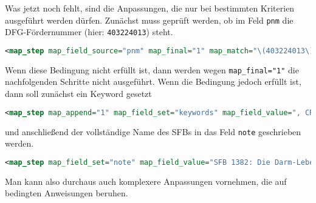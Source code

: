 \documentclass[ngerman]{dtk}
\begin{document}
Was jetzt noch fehlt, sind die Anpassungen, die nur bei bestimmten Kriterien ausgeführt werden dürfen. 
Zunächst muss geprüft werden, ob im Feld \texttt{pnm} die DFG-Fördernummer (hier: \texttt{403224013}) steht.
\begin{lstlisting}[style=nonumber,language=xml]
<map_step map_field_source="pnm" map_final="1" map_match="\(403224013\)"/>
\end{lstlisting}
Wenn diese Bedingung nicht erfüllt ist, dann werden wegen \texttt{map\_final="1"} 
die nachfolgenden Schritte nicht ausgeführt.
Wenn die Bedingung jedoch erfüllt ist, dann soll zunächst ein Keyword gesetzt 
\begin{lstlisting}[style=nonumber,language=xml]
<map_step map_append="1" map_field_set="keywords" map_field_value=", CRC1382"/>
\end{lstlisting}
 und anschließend der vollständige Name des SFBs in das Feld \texttt{note} geschrieben werden.
\begin{lstlisting}[style=nonumber,language=xml]
<map_step map_field_set="note" map_field_value="SFB 1382: Die Darm-Leber-Achse -- Funktionelle Zusammenhänge und therapeutische Strategien (403224013)"/>
\end{lstlisting}
Man kann also durchaus auch komplexere Anpassungen vornehmen, die auf bedingten Anweisungen beruhen.
\end{document}
